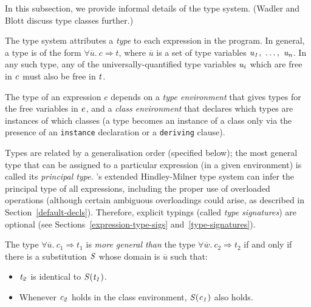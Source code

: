 In this subsection, we provide informal details of the type system.
(Wadler and Blott \cite{wadler:classes} discuss type
classes further.)


The \Haskell{} type system attributes a {\em type} to each
expression in the program.  In general, a type is of the form
$\forall \overline{u}.~c \Rightarrow t$,
where $\overline{u}$ is a set of type variables \mbox{$\it u_1,\ \ldots ,\ u_n$}.
In any such type, any of the universally-quantified type variables \mbox{$\it u_i$}
which are free in \mbox{$\it c$} must also be free in \mbox{$\it t$}.

The type of an expression $e$
depends on a {\em type environment}
that gives types for the free variables in \mbox{$\it e$}, and a
{\em class environment}
that declares which types are instances of which classes (a type becomes
an instance of a class only via the presence of an
\mbox{\tt instance} declaration or a \mbox{\tt deriving} clause).

Types are related by a generalisation order
(specified below);
the most general type that can be assigned to a particular
expression (in a given environment) is called its {\em
principal type}.
\Haskell{}'s extended Hindley-Milner type system can infer the principal
type of all expressions, including the proper use of overloaded
operations (although certain ambiguous overloadings could arise, as
described in Section~\ref{default-decls}).  Therefore, explicit typings (called
{\em type signatures})
are optional (see
Sections~\ref{expression-type-sigs} and~\ref{type-signatures}).

The type $\forall \overline{u}.~c_1 \Rightarrow t_1$ is
{\em more general than}
the type $\forall \overline{w}.~c_2 \Rightarrow t_2$ if and only if there is 
a substitution \mbox{$\it S$} whose domain is $\overline{u}$ such that:
\begin{itemize}
\item \mbox{$\it t_2$} is identical to \mbox{$\it S(t_1)$}.
\item Whenever \mbox{$\it c_2$} holds in the class environment, \mbox{$\it S(c_1)$} also holds.
\end{itemize}

